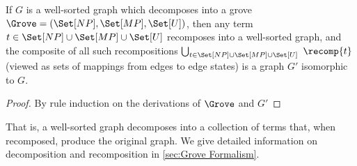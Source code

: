 \begin{theorem}
    If $G$ is a well-sorted graph which decomposes into a grove $\Grove = (\Set[NP], \Set[MP], \Set[U])$, then any term $t \in \Set[NP] \cup \Set[MP] \cup \Set[U]$ recomposes into a well-sorted graph, and the composite of all such recompositions $\bigcup_{t\in \Set[NP] \cup \Set[MP] \cup \Set[U]}$ $\recomp{t}$ (viewed as sets of mappings from edges to edge states) is a graph $G'$ isomorphic to $G$.
\end{theorem}

\begin{proof}
    By rule induction on the derivations of $\Grove$ and $G'$
\end{proof}

That is, a well-sorted graph decomposes into a collection of terms that, when recomposed, produce the original graph. We give detailed information on decomposition and recomposition in \autoref{sec:Grove Formalism}.












